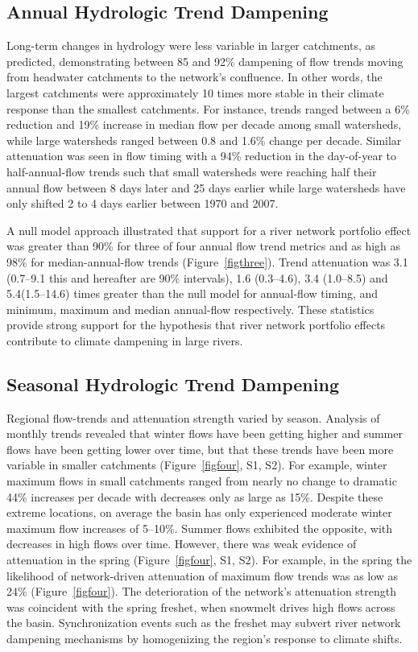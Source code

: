 \documentclass[linenumbers,draft]{AGUJournal}
\begin{document}
\subsection{Annual Hydrologic Trend Dampening}
Long-term changes in hydrology were less variable in larger catchments, as predicted, demonstrating between 85 and 92\% dampening of flow trends moving from headwater catchments to the network's confluence. In other words, the largest catchments were approximately 10 times more stable in their climate response than the smallest catchments. For instance, trends ranged between a 6\% reduction and 19\% increase in median flow per decade among small watersheds, while large watersheds ranged between 0.8 and 1.6\% change per decade. Similar attenuation was seen in flow timing with a 94\% reduction in the day-of-year to half-annual-flow trends such that small watersheds were reaching half their annual flow between 8 days later and 25 days earlier while large watersheds have only shifted 2 to 4 days earlier between 1970 and 2007. 

A null model approach illustrated that support for a river network portfolio effect was greater than 90\% for three of four annual flow trend metrics and as high as 98\% for median-annual-flow trends (Figure~\ref{figthree}). Trend attenuation was 3.1 (0.7--9.1 this and hereafter are 90\% intervals), 1.6 (0.3--4.6), 3.4 (1.0--8.5) and 5.4(1.5--14.6) times greater than the null model for annual-flow timing, and minimum, maximum and median annual-flow respectively. These statistics provide strong support for the hypothesis that river network portfolio effects contribute to climate dampening in large rivers.

\subsection{Seasonal Hydrologic Trend Dampening}
Regional flow-trends and attenuation strength varied by season. Analysis of monthly trends revealed that winter flows have been getting higher and summer flows have been getting lower over time, but that these trends have been more variable in smaller catchments (Figure~\ref{figfour}, S1, S2). For example, winter maximum flows in small catchments ranged from nearly no change to dramatic 44\% increases per decade with decreases only as large as 15\%. Despite these extreme locations, on average the basin has only experienced moderate winter maximum flow increases of 5--10\%. Summer flows exhibited the opposite, with decreases in high flows over time. However, there was weak evidence of attenuation in the spring (Figure~\ref{figfour}, S1, S2). For example, in the spring the likelihood of network-driven attenuation of maximum flow trends was as low as 24\% (Figure~\ref{figfour}). The deterioration of the network's attenuation strength was coincident with the spring freshet, when snowmelt drives high flows across the basin. Synchronization events such as the freshet may subvert river network dampening mechanisms by homogenizing the region's response to climate shifts.
\end{document}
